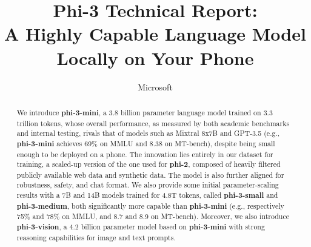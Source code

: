 \documentclass[11pt]{article}
\begin{document}
\title{Phi-3 Technical Report: \\
A Highly Capable Language Model Locally on Your Phone}

\author{Microsoft}
\date{}


\maketitle

\begin{abstract}
We introduce \textbf{phi-3-mini}, a 3.8 billion parameter language model trained on 3.3 trillion tokens, whose overall performance, as measured by both academic benchmarks and internal testing, rivals that of models such as Mixtral 8x7B and GPT-3.5 (e.g., \textbf{phi-3-mini} achieves 69\% on MMLU and 8.38 on MT-bench), despite being small enough to be deployed on a phone. The innovation lies entirely in our dataset for training, a scaled-up version of the one used for \textbf{phi-2}, composed of heavily filtered publicly available web data and synthetic data. The model is also further aligned for robustness, safety, and chat format.
We also provide some initial parameter-scaling results with a 7B and 14B models trained for 4.8T tokens, called \textbf{phi-3-small} and \textbf{phi-3-medium}, both significantly more capable than \textbf{phi-3-mini} (e.g., respectively 75\% and 78\% on MMLU, and 8.7 and 8.9 on MT-bench). Moreover, we also introduce \textbf{phi-3-vision}, a 4.2 billion parameter model based on \textbf{phi-3-mini} with strong reasoning capabilities for image and text prompts.
\end{abstract}
\end{document}
